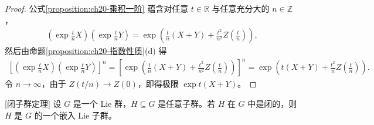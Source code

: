 \documentclass[../../main.tex]{subfiles}
\begin{document}
\begin{proof}
公式\eqref{proposition:ch20-乘积一阶} 蕴含对任意 $t\in\mathbb{R}$ 与任意充分大的 $n\in\mathbb{Z}$，
\begin{align*}
\left(\exp\frac{t}{n}X\right)\left(\exp\frac{t}{n}Y\right)
=\exp\left(\frac{t}{n}(X+Y)+\frac{t^2}{n^2}Z\!\left(\frac{t}{n}\right)\right),
\end{align*}
然后由命题\cref{proposition:ch20-指数性质}(d) 得
\begin{align*}
\left[\left(\exp\frac{t}{n}X\right)\left(\exp\frac{t}{n}Y\right)\right]^n
=\left[\exp\left(\frac{t}{n}(X+Y)+\frac{t^2}{n^2}Z\!\left(\frac{t}{n}\right)\right)\right]^n
=\exp\left(t(X+Y)+\frac{t^2}{n}Z\!\left(\frac{t}{n}\right)\right).
\end{align*}
令 $n\to\infty$，由于 $Z(t/n)\to Z(0)$，即得极限 $\exp t(X+Y)$。
\end{proof}

\begin{theorem}{[闭子群定理]}\label{theorem:ch20-闭子群定理}
设 $G$ 是一个 Lie 群，$H\subseteq G$ 是任意子群。若 $H$ 在 $G$ 中是闭的，则 $H$ 是 $G$ 的一个嵌入 Lie 子群。
\end{theorem}
\end{document}
